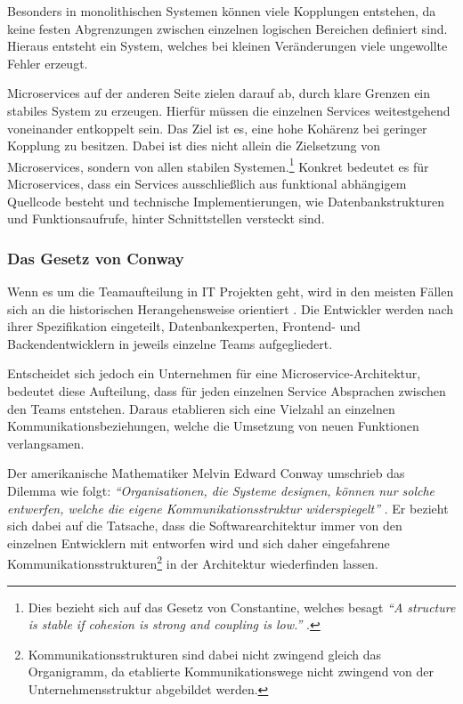 Besonders in monolithischen Systemen können viele Kopplungen entstehen, da keine festen Abgrenzungen zwischen einzelnen logischen Bereichen definiert sind. Hieraus entsteht ein System, welches bei kleinen Veränderungen viele ungewollte Fehler erzeugt.

Microservices auf der anderen Seite zielen darauf ab, durch klare Grenzen ein stabiles System zu erzeugen. Hierfür müssen die einzelnen Services weitestgehend voneinander entkoppelt sein. Das Ziel ist es, eine hohe Kohärenz bei geringer Kopplung zu besitzen. Dabei ist dies nicht allein die Zielsetzung von Microservices, sondern von allen stabilen Systemen.\footnote{Dies bezieht sich auf das Gesetz von Constantine, welches besagt \textit{\enquote{A structure is stable if cohesion is strong and coupling is low.}} \parencite[][S. 43]{endres_handbook_2003}.} Konkret bedeutet es für Microservices, dass ein Services ausschließlich aus funktional abhängigem Quellcode besteht und technische Implementierungen, wie Datenbankstrukturen und Funktionsaufrufe, hinter Schnittstellen versteckt sind.

\subsubsection{Das Gesetz von Conway}
\label{sec:conway}

Wenn es um die Teamaufteilung in IT Projekten geht, wird in den meisten Fällen sich an die historischen Herangehensweise orientiert \parencite[vgl.][Kap. 4.2]{wolff_microservices_2018}. Die Entwickler werden nach ihrer Spezifikation eingeteilt, Datenbankexperten, Frontend- und Backendentwicklern in jeweils einzelne Teams aufgegliedert.

Entscheidet sich jedoch ein Unternehmen für eine Microservice-Architektur, bedeutet diese Aufteilung, dass für jeden einzelnen Service Absprachen zwischen den Teams entstehen. Daraus etablieren sich eine Vielzahl an einzelnen Kommunikationsbeziehungen, welche die Umsetzung von neuen Funktionen verlangsamen.

Der amerikanische Mathematiker Melvin Edward Conway umschrieb das Dilemma wie folgt:
\textit{\enquote{Organisationen, die Systeme designen, können nur solche entwerfen, welche die eigene Kommunikationsstruktur widerspiegelt}} \parencite{conway_conways_1968}.
Er bezieht sich dabei auf die Tatsache, dass die Softwarearchitektur immer von den einzelnen Entwicklern mit entworfen wird und sich daher eingefahrene Kommunikationsstrukturen\footnote{Kommunikationsstrukturen sind dabei nicht zwingend gleich das Organigramm, da etablierte Kommunikationswege nicht zwingend von der Unternehmensstruktur abgebildet werden.} in der Architektur wiederfinden lassen.

